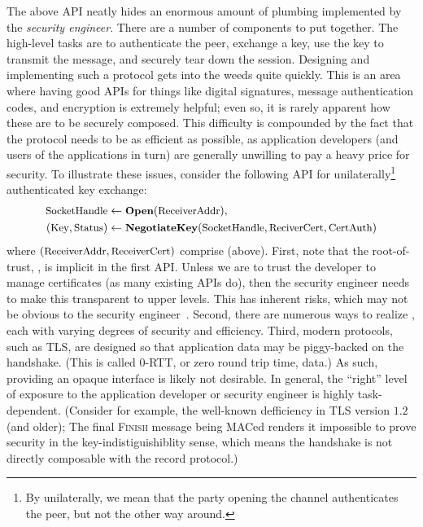 The above API neatly hides an enormous amount of plumbing implemented by the
\emph{security engineer}. There are a number of components to put together. The
high-level tasks are to authenticate the peer, exchange a key, use the key to
transmit the message, and securely tear down the session. Designing and
implementing such a protocol gets into the weeds quite quickly. This is an area
where having good APIs for things like digital signatures, message
authentication codes, and encryption is extremely helpful; even so, it is rarely
apparent how these are to be securely composed. This difficulty is compounded by
the fact that the protocol needs to be as efficient as possible, as application
developers (and users of the applications in turn) are generally unwilling to
pay a heavy price for security.
%
To illustrate these issues, consider the following API for
unilaterally\footnote{By unilaterally, we mean that the party opening the
channel authenticates the peer, but not the other way around.}
authenticated key exchange:
\begin{align*}
  \textrm{\small SocketHandle} &\gets\textrm{\small\bf Open}(\textrm{\small ReceiverAddr}), \\
  (\textrm{\small Key}, \textrm{\small Status}) &\gets \textrm{\small\bf NegotiateKey}(
    \textrm{\small SocketHandle}, \textrm{\small ReciverCert}, \textrm{\small CertAuth})
\end{align*}
where $(\textrm{\small ReceiverAddr}, \textrm{\small ReceiverCert})$ comprise
 (above).  First, note that the root-of-trust,
, is implicit in the first API. Unless we are to trust the
developer to manage certificates (as many existing APIs do), then
the security engineer needs to make this transparent to upper levels. This has
inherent risks, which may not be obvious to the security engineer~\cite{FHM+12}. Second,
there are numerous ways to realize , each with varying
degrees of security and efficiency. Third, modern protocols, such as TLS, are
designed so that application data may be piggy-backed on the handshake. (This is
called 0-RTT, or zero round trip time, data.) As such,
providing an opaque interface is likely not desirable. In general, the ``right''
level of exposure to the application developer or security engineer is highly
task-dependent.
%
  (Consider for example, the well-known defficiency in TLS version $1.2$ (and
  older); The final \textsc{Finish} message being MACed renders it impossible to
  prove security in the key-indistiguishiblity sense, which means the handshake
  is not directly composable with the record protocol.)
\fi
%
\fi

